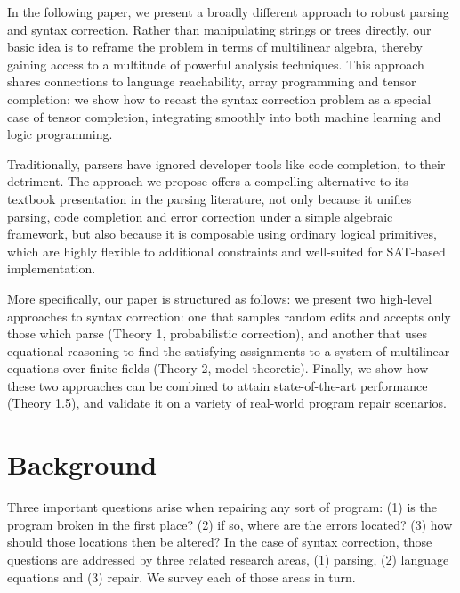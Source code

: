 \documentclass[sigplan,review,anonymous,acmsmall]{acmart}\settopmatter{printfolios=false,printccs=false,printacmref=false}
\begin{document}
In the following paper, we present a broadly different approach to robust parsing and syntax correction. Rather than manipulating strings or trees directly, our basic idea is to reframe the problem in terms of multilinear algebra, thereby gaining access to a multitude of powerful analysis techniques. This approach shares connections to language reachability, array programming and tensor completion: we show how to recast the syntax correction problem as a special case of tensor completion, integrating smoothly into both machine learning and logic programming.

Traditionally, parsers have ignored developer tools like code completion, to their detriment. The approach we propose offers a compelling alternative to its textbook presentation in the parsing literature, not only because it unifies parsing, code completion and error correction under a simple algebraic framework, but also because it is composable using ordinary logical primitives, which are highly flexible to additional constraints and well-suited for SAT-based implementation.

More specifically, our paper is structured as follows: we present two high-level approaches to syntax correction: one that samples random edits and accepts only those which parse (Theory 1, probabilistic correction), and another that uses equational reasoning to find the satisfying assignments to a system of multilinear equations over finite fields (Theory 2, model-theoretic). Finally, we show how these two approaches can be combined to attain state-of-the-art performance (Theory 1.5), and validate it on a variety of real-world program repair scenarios.

\section{Background}


Three important questions arise when repairing any sort of program: (1) is the program broken in the first place? (2) if so, where are the errors located? (3) how should those locations then be altered? In the case of syntax correction, those questions are addressed by three related research areas, (1) parsing, (2) language equations and (3) repair. We survey each of those areas in turn.
\end{document}
